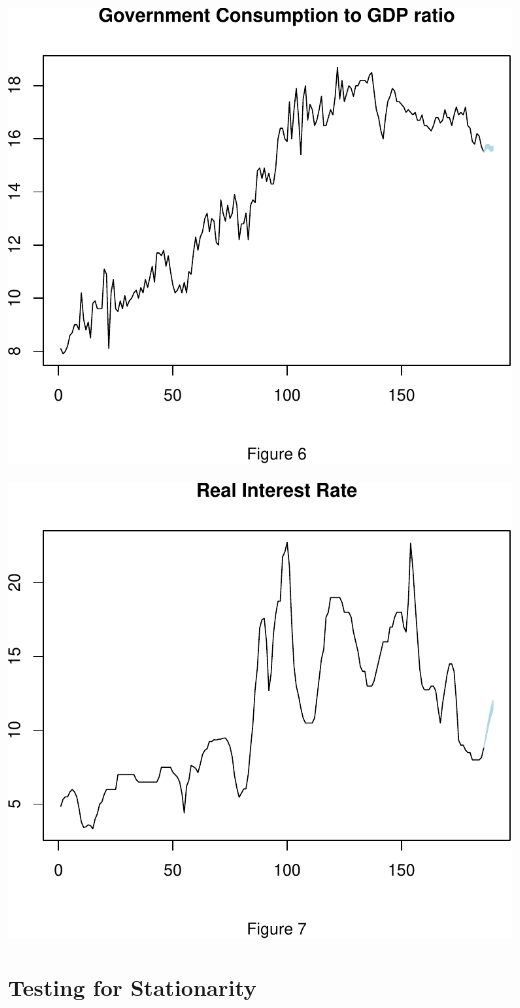 \documentclass[11pt,preprint, authoryear]{elsarticle}
\numberwithin{equation}{section}
\numberwithin{figure}{section}
\numberwithin{table}{section}
\begin{document}
\includegraphics{TS_proj_files/figure-latex/unnamed-chunk-27-1.pdf}

\includegraphics{TS_proj_files/figure-latex/unnamed-chunk-28-1.pdf}

\hypertarget{testing-for-stationarity}{%
\subsection{Testing for Stationarity}\label{testing-for-stationarity}}
\end{document}
